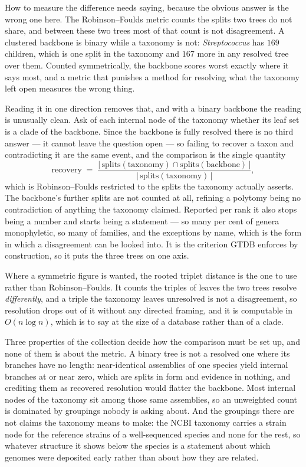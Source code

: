 \documentclass[pdflatex,sn-vancouver-num]{sn-jnl}
\begin{document}
How to measure the difference needs saying, because the obvious answer is the wrong one here. The
Robinson--Foulds metric \cite{robinson1981comparison} counts the splits two trees do not share, and
between these two trees most of that count is not disagreement. A clustered backbone is binary while
a taxonomy is not: \emph{Streptococcus} has $169$ children, which is one split in the taxonomy and
$167$ more in any resolved tree over them. Counted symmetrically, the backbone scores worst exactly
where it says most, and a metric that punishes a method for resolving what the taxonomy left open
measures the wrong thing.

Reading it in one direction removes that, and with a binary backbone the reading is unusually clean.
Ask of each internal node of the taxonomy whether its leaf set is a clade of the backbone. Since the
backbone is fully resolved there is no third answer --- it cannot leave the question open --- so
failing to recover a taxon and contradicting it are the same event, and the comparison is the single
quantity
%
\begin{equation*}
  \text{recovery} \;=\;
  \frac{\lvert\, \mathrm{splits}(\text{taxonomy}) \cap \mathrm{splits}(\text{backbone}) \,\rvert}
       {\lvert\, \mathrm{splits}(\text{taxonomy}) \,\rvert} ,
\end{equation*}
%
which is Robinson--Foulds restricted to the splits the taxonomy actually asserts. The backbone's
further splits are not counted at all, refining a polytomy being no contradiction of anything the
taxonomy claimed. Reported per rank it also stops being a number and starts being a statement --- so
many per cent of genera monophyletic, so many of families, and the exceptions by name, which is the
form in which a disagreement can be looked into. It is the criterion GTDB enforces by construction,
so it puts the three trees on one axis.

Where a symmetric figure is wanted, the rooted triplet distance is the one to use rather than
Robinson--Foulds. It counts the triples of leaves the two trees resolve \emph{differently}, and a
triple the taxonomy leaves unresolved is not a disagreement, so resolution drops out of it without
any directed framing, and it is computable in $O(n \log n)$, which is to say at the size of a
database rather than of a clade.

Three properties of the collection decide how the comparison must be set up, and none of them is
about the metric. A binary tree is not a resolved one where its branches have no length:
near-identical assemblies of one species yield internal branches at or near zero, which are splits in
form and evidence in nothing, and crediting them as recovered resolution would flatter the backbone.
Most internal nodes of the taxonomy sit among those same assemblies, so an unweighted count is
dominated by groupings nobody is asking about. And the groupings there are not claims the taxonomy
means to make: the NCBI taxonomy carries a strain node for the reference strains of a well-sequenced
species and none for the rest, so whatever structure it shows below the species is a statement about
which genomes were deposited early rather than about how they are related.
\end{document}
